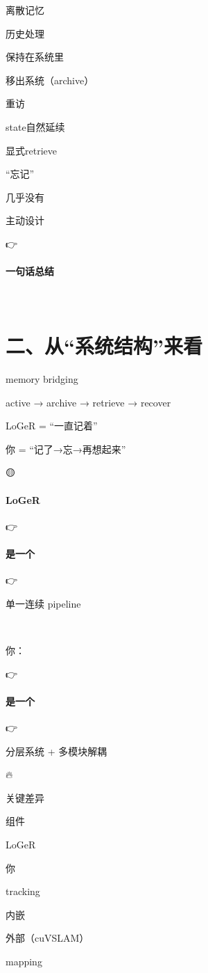\documentclass[12pt]{article}
\begin{document}
离散记忆

历史处理

保持在系统里

移出系统（archive）

重访

state自然延续

显式retrieve

“忘记”

几乎没有

主动设计

👉

\paragraph{一句话总结}
🧩

\section{二、从“系统结构”来看}
memory bridging

active → archive → retrieve → recover

LoGeR = “一直记着”

你 = “记了→忘→再想起来”

🟡

\paragraph{LoGeR}
👉

\paragraph{是一个}
👉

单一连续 pipeline

🔵

你：

👉

\paragraph{是一个}
👉

分层系统 + 多模块解耦

🔥

关键差异

组件

LoGeR

你

tracking

内嵌

外部（cuVSLAM）

mapping
\end{document}
